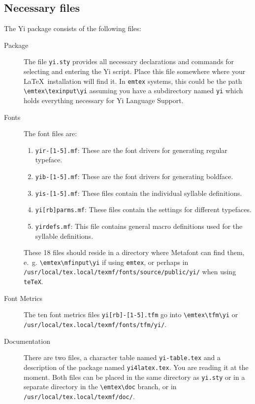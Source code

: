 \documentclass[11pt,a4paper]{article}
\begin{document}
\subsection{Necessary files}
The Yi package consists of the following files:
\begin{raggedright}
\begin{description}
\item [Package] The file {\tt yi.sty} provides all necessary
	declarations and commands for selecting and entering the
	Yi script. Place this file somewhere where your
	\LaTeX\ installation will find it. In {\tt emtex} systems,
	this could be the path \verb"\emtex\texinput\yi" assuming you
	have a subdirectory named \verb"yi" which holds everything
	necessary for Yi Language Support.
\item [Fonts] The font files are:
	\begin{enumerate}
		\item {\tt yir-[1-5].mf}: These are the font drivers
					for generating regular typeface. 
		\item {\tt yib-[1-5].mf}: These are the font drivers
					for generating boldface. 
		\item {\tt yis-[1-5].mf}: These files contain the
					individual syllable definitions.
		\item {\tt yi[rb]parms.mf}: These files contain the
					settings for different typefaces.
		\item {\tt yirdefs.mf}: This file contains general
					macro definitions used for
					the syllable definitions.
	\end{enumerate}
	These 18 files should
	reside in a directory where {\sc Metafont} can find them, e.~g.
	\verb"\emtex\mfinput\yi" if using \verb"emtex", or perhaps in
	\verb"/usr/local/tex.local/texmf/fonts/source/public/yi/" when
	using \verb"teTeX".

\item [Font Metrics] The ten font metrics files {\tt yi[rb]-[1-5].tfm} 
	go into \verb"\emtex\tfm\yi" or 
	\verb"/usr/local/tex.local/texmf/fonts/tfm/yi/".

\item [Documentation] There are two files, a character table
	named \verb"yi-table.tex" and a description of the
	package named {\tt yi4latex.tex}. You are reading it at
	the moment. Both files can be placed in the same
	directory as {\tt yi.sty} or in a separate directory in the 
	\verb"\emtex\doc" branch, or in
	\verb"/usr/local/tex.local/texmf/doc/".
\end{description}
\end{raggedright}
\end{document}
